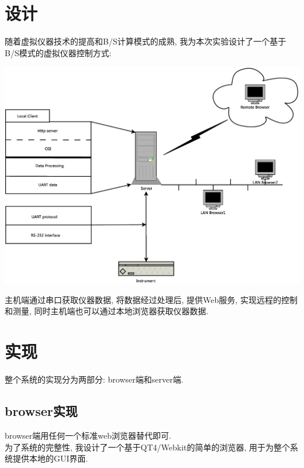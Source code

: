 \documentclass{article}
\begin{document}
\section{设计}
随着虚拟仪器技术的提高和B/S计算模式的成熟, 我为本次实验设计了一个基于B/S模式的虚拟仪器控制方式:\\
\begin{center}
\includegraphics[width=\textwidth]{image/all.eps}\\[2em]
\end{center}
主机端通过串口获取仪器数据, 将数据经过处理后, 提供Web服务, 实现远程的控制和测量, 同时主机端也可以通过本地浏览器获取仪器数据.\\
\section{实现}
整个系统的实现分为两部分: browser端和server端.

\subsection{browser实现}
browser端用任何一个标准web浏览器替代即可.\\
为了系统的完整性, 我设计了一个基于QT4/Webkit的简单的浏览器, 用于为整个系统提供本地的GUI界面.
\end{document}
